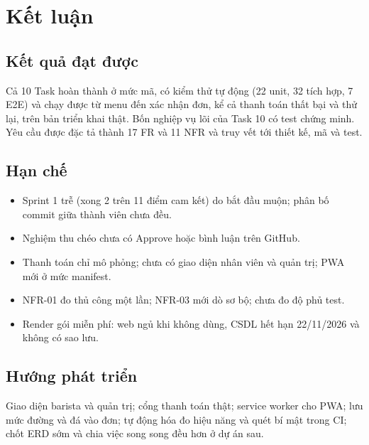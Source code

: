\chapter{Kết luận}\label{ch:ketluan-se}
\section{Kết quả đạt được}\label{sec:se-dat}
Cả 10 Task hoàn thành ở mức mã, có kiểm thử tự động (22 unit, 32 tích hợp, 7 E2E) và chạy được từ menu đến xác nhận đơn, kể cả thanh toán thất bại và thử lại, trên bản triển khai thật. Bốn nghiệp vụ lõi của Task 10 có test chứng minh. Yêu cầu được đặc tả thành 17 FR và 11 NFR và truy vết tới thiết kế, mã và test.

\section{Hạn chế}\label{sec:se-hanche}
\begin{itemize}
\item Sprint 1 trễ (xong 2 trên 11 điểm cam kết) do bắt đầu muộn; phân bố commit giữa thành viên chưa đều.
\item Nghiệm thu chéo chưa có Approve hoặc bình luận trên GitHub.
\item Thanh toán chỉ mô phỏng; chưa có giao diện nhân viên và quản trị; PWA mới ở mức manifest.
\item NFR-01 đo thủ công một lần; NFR-03 mới dò sơ bộ; chưa đo độ phủ test.
\item Render gói miễn phí: web ngủ khi không dùng, CSDL hết hạn 22/11/2026 và không có sao lưu.
\end{itemize}

\section{Hướng phát triển}\label{sec:se-huong}
Giao diện barista và quản trị; cổng thanh toán thật; service worker cho PWA; lưu mức đường và đá vào đơn; tự động hóa đo hiệu năng và quét bí mật trong CI; chốt ERD sớm và chia việc song song đều hơn ở dự án sau.
